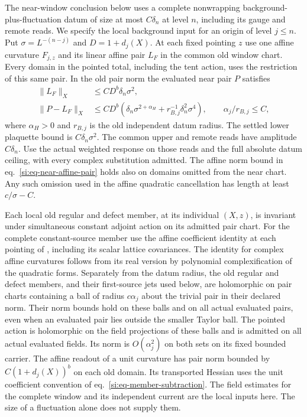 \documentclass[11pt,letterpaper,reqno]{amsart}
\numberwithin{equation}{section}
\renewcommand{\eqref}[1]{\textup{eq.~\ref{#1}}}
\theoremstyle{definition}
\theoremstyle{remark}
\begin{document}
The near-window conclusion below uses a complete nonwrapping
background-plus-fluctuation datum of size at most $C\delta_n$ at
level $n$, including its gauge and remote reads. We specify the
local background input for an origin of level $j\le n$. Put
$\sigma=L^{-(n-j)}$ and $D=1+d_j(X)$. At each fixed pointing $z$
use one affine curvature $F_{j,z}$ and its linear affine pair $L_F$
in the common old window chart. Every domain in the pointed total,
including the tent action, uses the restriction of this same pair.
In the old pair norm the evaluated near pair $P$ satisfies
\begin{equation}\label{si:eq-near-affine-pair}
 \begin{split}
 \|L_F\|_X&\le C D^b\delta_n\sigma^2,\\
 \|P-L_F\|_X&\le C D^b(\delta_n\sigma^{2+\alpha_H}
                       +r_{B,j}^{-1}\delta_n^2\sigma^4),
 \qquad \alpha_j/r_{B,j}\le C,
 \end{split}
\end{equation}
where $\alpha_H>0$ and $r_{B,j}$ is the old independent datum
radius. The settled lower plaquette bound is $C\delta_n\sigma^2$.
The common upper and remote reads have amplitude $C\delta_n$.
Use the actual weighted response on those reads and the full
absolute datum ceiling, with every complex substitution admitted.
The affine norm bound in \eqref{si:eq-near-affine-pair} holds also
on domains omitted from the near chart. Any such omission used
in the affine quadratic cancellation has length at least
$c/\sigma-C$.

Each local old regular and defect member, at its individual
$(X,z)$, is invariant under simultaneous constant adjoint action
on its admitted pair chart. For the complete constant-source
member use the affine coefficient identity at each pointing of
\cite[Lemma~7.1]{EM}, including its scalar lattice covariances.
The identity for complex affine curvatures follows from its real
version by polynomial complexification of the quadratic forms.
Separately from the datum radius, the old regular and defect
members, and their first-source jets used below, are holomorphic
on pair charts containing a ball of radius $c\alpha_j$
about the trivial pair in their declared norm. Their norm bounds
hold on these balls and on all actual evaluated pairs, even when
an evaluated pair lies outside the smaller Taylor ball. The
pointed action is holomorphic on the field projections of these
balls and is admitted on all actual evaluated fields. Its norm is
$O(\alpha_j^2)$ on both sets on its fixed bounded carrier.
The affine readout of a unit curvature has pair norm bounded by
$C(1+d_j(X))^b$ on each old domain. Its transported Hessian
uses the unit coefficient convention of
\eqref{si:eq-member-subtraction}. The field estimates for the
complete window and its independent current are the local inputs
here. The size of a fluctuation alone does not supply them.
\end{document}
